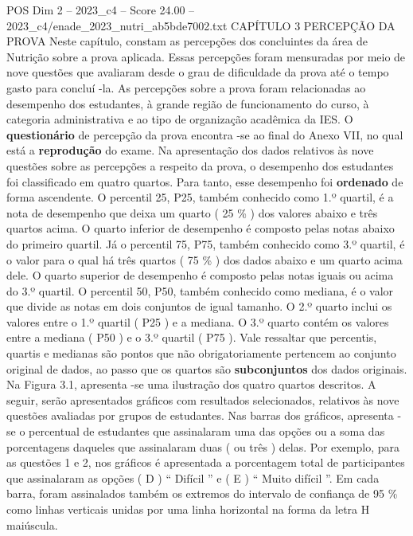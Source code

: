 \begin{textsample}{POS Dim 2 – 2023\_c4 – Score 24.00 – 2023\_c4/enade\_2023\_nutri\_ab5bde7002.txt}  \label{ex:f2_pos_006}
CAPÍTULO 3 PERCEPÇÃO DA PROVA Neste capítulo, constam as percepções dos concluintes da área de Nutrição sobre a prova aplicada.
Essas percepções foram mensuradas por meio de nove questões que avaliaram desde o grau de dificuldade da prova até o tempo gasto para concluí -la.
As percepções sobre a prova foram relacionadas ao desempenho dos estudantes, à grande região de funcionamento do curso, à categoria administrativa e ao tipo de organização acadêmica da IES.
O \textbf{questionário} de percepção da prova encontra -se ao final do Anexo VII, no qual está a \textbf{reprodução} do exame.
Na apresentação dos dados relativos às nove questões sobre as percepções a respeito da prova, o desempenho dos estudantes foi classificado em quatro quartos.
Para tanto, esse desempenho foi \textbf{ordenado} de forma ascendente.
O percentil 25, P25, também conhecido como 1.º quartil, é a nota de desempenho que deixa um quarto ( 25 \% ) dos valores abaixo e três quartos acima.
O quarto inferior de desempenho é composto pelas notas abaixo do primeiro quartil.
Já o percentil 75, P75, também conhecido como 3.º quartil, é o valor para o qual há três quartos ( 75 \% ) dos dados abaixo e um quarto acima dele.
O quarto superior de desempenho é composto pelas notas iguais ou acima do 3.º quartil.
O percentil 50, P50, também conhecido como mediana, é o valor que divide as notas em dois conjuntos de igual tamanho.
O 2.º quarto inclui os valores entre o 1.º quartil ( P25 ) e a mediana.
O 3.º quarto contém os valores entre a mediana ( P50 ) e o 3.º quartil ( P75 ).
Vale ressaltar que percentis, quartis e medianas são pontos que não obrigatoriamente pertencem ao conjunto original de dados, ao passo que os quartos são \textbf{subconjuntos} dos dados originais.
Na Figura 3.1, apresenta -se uma ilustração dos quatro quartos descritos.
A seguir, serão apresentados gráficos com resultados selecionados, relativos às nove questões avaliadas por grupos de estudantes.
Nas barras dos gráficos, apresenta -se o percentual de estudantes que assinalaram uma das opções ou a soma das porcentagens daqueles que assinalaram duas ( ou três ) delas.
Por exemplo, para as questões 1 e 2, nos gráficos é apresentada a porcentagem total de participantes que assinalaram as opções ( D ) “ Difícil ” e ( E ) “ Muito difícil ”.
Em cada barra, foram assinalados também os extremos do intervalo de confiança de 95 \% como linhas verticais unidas por uma linha horizontal na forma da letra H maiúscula.

\end{textsample}
